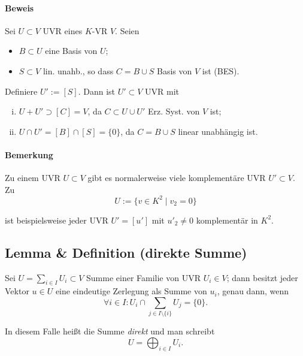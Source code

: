 \paragraph{Beweis}
	Sei $ U\subset V $ UVR eines $ K $-VR $ V $.
	Seien 
		\begin{itemize}
		\item $ B\subset U $ eine Basis von $ U $;
		\item $ S\subset V $ lin. unahb., so dass $ C=B\cup S $ Basis von $ V $ ist (BES).
		\end{itemize}
	Definiere $ U':= [S] $. Dann ist $ U'\subset V $ UVR mit
		\begin{enumerate}[(i)]
		\item $ U+U' \supset [C] = V $, da $ C\subset U\cup U' $ Erz. Syst. von $ V $ ist;
		\item $ U\cap U' = [B]\cap [S] = \{0\}$, da $ C=B\cup S $ linear unabhängig ist.
		\end{enumerate}
		
\paragraph{Bemerkung}
	Zu einem UVR $ U\subset V $ gibt es normalerweise viele komplementäre UVR $ U'\subset V $.
	Zu
		\begin{equation*}
		U:= \{v\in K^2\mid v_2 = 0\}
		\end{equation*}
	
	ist beispielsweise jeder UVR $ U' = [u']$ mit $u'_2\neq 0 $ komplementär in $ K^2 $.
	
\subsection{Lemma \& Definition (direkte Summe)}
	\begin{Definition}
	Sei $ U= \sum_{i\in I}U_i\subset V $ Summe einer Familie von UVR $ U_i\in V $; dann besitzt jeder Vektor $ u\in U $ eine eindeutige Zerlegung als Summe von $ u_i $, genau dann, wenn
		\begin{equation*}
		\forall i\in I: U_i\cap \sum_{j\in I\setminus \{i\}}U_j = \{0 \}.
		\end{equation*}
		
	In diesem Falle heißt die Summe \emph{direkt} und man schreibt
	\[ U = \bigoplus_{i\in I} U_i. \]
	\end{Definition}
		
